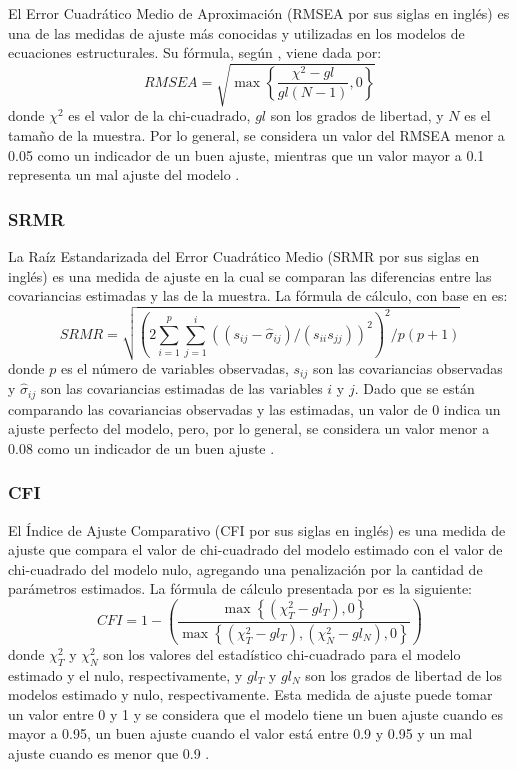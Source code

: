 \documentclass[english]{revcoles}
\begin{document}
El Error Cuadrático Medio de Aproximación (RMSEA por sus siglas en inglés) es una de las medidas de ajuste más conocidas y utilizadas en los modelos de ecuaciones estructurales. Su fórmula, según , viene dada por:
\[
  RMSEA = \sqrt{\max\left\{\frac{\chi^2 - gl}{gl (N-1)} , 0 \right\}}
\]
donde \(\chi^2\) es el valor de la chi-cuadrado, \(gl\) son los grados de libertad, y \(N\) es el tamaño de la muestra. Por lo general, se considera un valor del RMSEA menor a 0.05 como un indicador de un buen ajuste, mientras que un valor mayor a 0.1 representa un mal ajuste del modelo \cite{Kenny2015}.

\subsubsection{SRMR}

La Raíz Estandarizada del Error Cuadrático Medio (SRMR por sus siglas en inglés) es una medida de ajuste en la cual se comparan las diferencias entre las covariancias estimadas y las de la muestra. La fórmula de cálculo, con base en  es:
\[
  SRMR = \sqrt{\left(2 \sum\limits_{i=1}^p \sum\limits_{j=1}^i \left((s_{ij} - \hat\sigma_{ij}) / (s_{ii} s_{jj}) \right)^2 \right)^2 / p(p+1)}
\]
donde \(p\) es el número de variables observadas, \(s_{ij}\) son las covariancias observadas y \(\hat\sigma_{ij}\) son las covariancias estimadas de las variables \(i\) y \(j\). Dado que se están comparando las covariancias observadas y las estimadas, un valor de 0 indica un ajuste perfecto del modelo, pero, por lo general, se considera un valor menor a 0.08 como un indicador de un buen ajuste \cite{Kenny2015}.

\subsubsection{CFI}

El Índice de Ajuste Comparativo (CFI por sus siglas en inglés) es una medida de ajuste que compara el valor de chi-cuadrado del modelo estimado con el valor de chi-cuadrado del modelo nulo, agregando una penalización por la cantidad de parámetros estimados. La fórmula de cálculo presentada por  es la siguiente:
\[
  CFI = 1 - \left( \frac{\max \left\{(\chi^2_T - gl_T), 0  \right\}}{\max \left\{(\chi^2_T - gl_T), (\chi^2_N - gl_N), 0 \right\}} \right)
\]
donde \(\chi^2_T\) y \(\chi^2_N\) son los valores del estadístico chi-cuadrado para el modelo estimado y el nulo, respectivamente, y \(gl_T\) y \(gl_N\) son los grados de libertad de los modelos estimado y nulo, respectivamente. Esta medida de ajuste puede tomar un valor entre 0 y 1 y se considera que el modelo tiene un buen ajuste cuando es mayor a 0.95, un buen ajuste cuando el valor está entre 0.9 y 0.95 y un mal ajuste cuando es menor que 0.9 \cite{Kenny2015}.
\end{document}
